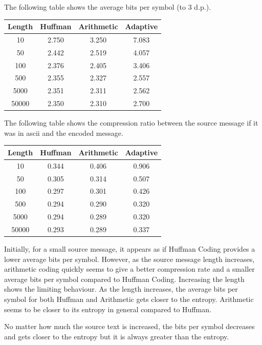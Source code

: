 \documentclass{article}
\begin{document}
The following table shows the average bits per symbol (to 3 d.p.).

\begin{center}
  \begin{tabular}{ |c|c|c|c| } 
    \hline
    Length & Huffman & Arithmetic & Adaptive \\
    \hline
    10 & 2.750 & 3.250 & 7.083 \\ 
    50 & 2.442 & 2.519 & 4.057 \\
    100 & 2.376 & 2.405 & 3.406 \\
    500 & 2.355 & 2.327 & 2.557 \\
    5000 & 2.351 & 2.311 & 2.562 \\
    50000 & 2.350 & 2.310 & 2.700 \\
    \hline
  \end{tabular}
\end{center}

The following table shows the compression ratio between the source message if it was in ascii and the encoded message.

\begin{center}
  \begin{tabular}{ |c|c|c|c| } 
    \hline
    Length & Huffman & Arithmetic & Adaptive \\
    \hline
    10 & 0.344 & 0.406 & 0.906 \\ 
    50 & 0.305 & 0.314 & 0.507 \\
    100 & 0.297 & 0.301 & 0.426 \\
    500 & 0.294 & 0.290 & 0.320 \\
    5000 & 0.294 & 0.289 & 0.320 \\
    50000 & 0.293 & 0.289 & 0.337 \\
    \hline
  \end{tabular}
\end{center}

Initially, for a small source message, it appears as if Huffman Coding provides a lower average bits per symbol. However, as the source message length increases, arithmetic coding quickly seems to give a better compression rate and a smaller average bits per symbol compared to Huffman Coding. Increasing the length shows the limiting behaviour. As the length increases, the average bits per symbol for both Huffman and Arithmetic gets closer to the entropy. Arithmetic seems to be closer to its entropy in general compared to Huffman.

No matter how much the source text is increased, the bits per symbol decreases and gets closer to the entropy but it is always greater than the entropy.
\end{document}
